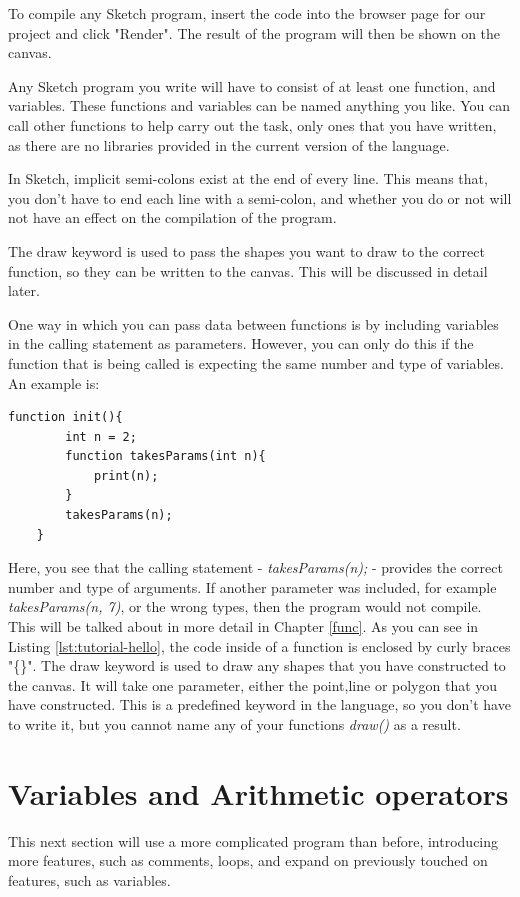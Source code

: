 \documentclass{l3proj}
\begin{document}
To compile any Sketch program, insert the code into the browser page for our project and click "Render". The result of the program will then be shown on the canvas.

Any Sketch program you write will have to consist of at least one function, and variables. These functions and variables can be named anything you like. You can call other functions to help carry out the task, only ones that you have written, as there are no libraries provided in the current version of the language. 

In Sketch, implicit semi-colons exist at the end of every line. This means that, you don't have to end each line with a semi-colon, and whether you do or not will not have an effect on the compilation of the program. 

The draw keyword is used to pass the shapes you want to draw to the correct function, so they can be written to the canvas. This will be discussed in detail later.

One way in which you can pass data between functions is by including variables in the calling statement as parameters. However, you can only do this if the function that is being called is expecting the same number and type of variables. An example is:

\begin{lstlisting}[caption={Function Parameters},label={lst:tutorial-parameters}]
    function init(){
        int n = 2;
        function takesParams(int n){
            print(n);
        }
        takesParams(n);
    }
\end{lstlisting}

Here, you see that the calling statement - \textit{takesParams(n);} - provides the correct number and type of arguments. If another parameter was included, for example \textit{takesParams(n, 7)}, or the wrong types, then the program would not compile. This will be talked about in more detail in Chapter \ref{func}. As you can see in Listing \ref{lst:tutorial-hello}, the code inside of a function is enclosed by curly braces "\{\}". The draw keyword is used to draw any shapes that you have constructed to the canvas. It will take one parameter, either the point,line or polygon that you have constructed. This is a predefined keyword in the language, so you don't have to write it, but you cannot name any of your functions \textit{draw()} as a result. 

\section{Variables and Arithmetic operators}
\label{vars}
This next section will use a more complicated program than before, introducing more features, such as comments, loops, and expand on previously touched on features, such as variables.
\end{document}

